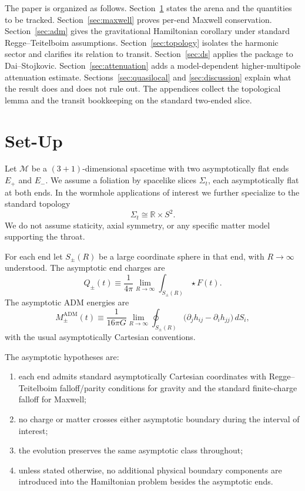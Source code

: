 \documentclass[aps,prd,onecolumn,nofootinbib,superscriptaddress]{revtex4-2}
\begin{document}
The paper is organized as follows. Section~\ref{sec:setup} states the arena and the quantities to be tracked. Section~\ref{sec:maxwell} proves per-end Maxwell conservation. Section~\ref{sec:adm} gives the gravitational Hamiltonian corollary under standard Regge--Teitelboim assumptions. Section~\ref{sec:topology} isolates the harmonic sector and clarifies its relation to transit. Section~\ref{sec:ds} applies the package to Dai--Stojkovic. Section~\ref{sec:attenuation} adds a model-dependent higher-multipole attenuation estimate. Sections~\ref{sec:quasilocal} and \ref{sec:discussion} explain what the result does and does not rule out. The appendices collect the topological lemma and the transit bookkeeping on the standard two-ended slice.

\section{Set-Up}
\label{sec:setup}

Let $\mathcal{M}$ be a $(3+1)$-dimensional spacetime with two asymptotically flat ends $E_+$ and $E_-$. We assume a foliation by spacelike slices $\Sigma_t$, each asymptotically flat at both ends. In the wormhole applications of interest we further specialize to the standard topology
\begin{equation}
\Sigma_t \cong \mathbb{R}\times S^2.
\end{equation}
We do not assume staticity, axial symmetry, or any specific matter model supporting the throat.

For each end let $S_\pm(R)$ be a large coordinate sphere in that end, with $R\to\infty$ understood. The asymptotic end charges are
\begin{equation}
Q_\pm(t) \equiv \frac{1}{4\pi}\lim_{R\to\infty}\int_{S_\pm(R)} \star F(t).
\end{equation}
The asymptotic ADM energies are
\begin{equation}
M_\pm^{\mathrm{ADM}}(t) \equiv \frac{1}{16\pi G}\lim_{R\to\infty}\oint_{S_\pm(R)}
\big(\partial_j h_{ij}-\partial_i h_{jj}\big)\, dS_i,
\end{equation}
with the usual asymptotically Cartesian conventions.\cite{ArnowittDeserMisner1962Dynamics,ReggeTeitelboim1974SurfaceIntegrals}

The asymptotic hypotheses are:
\begin{enumerate}
    \item each end admits standard asymptotically Cartesian coordinates with Regge--Teitelboim falloff/parity conditions for gravity and the standard finite-charge falloff for Maxwell;\cite{ReggeTeitelboim1974SurfaceIntegrals,Wald1984GeneralRelativity}
    \item no charge or matter crosses either asymptotic boundary during the interval of interest;
    \item the evolution preserves the same asymptotic class throughout;
    \item unless stated otherwise, no additional physical boundary components are introduced into the Hamiltonian problem besides the asymptotic ends.
\end{enumerate}
\end{document}
